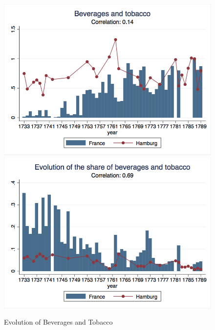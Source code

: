 \documentclass[12pt,a4paper,titlepage,english]{article}
\begin{document}
\begin{figure}
\caption{Evolution of Beverages and Tobacco}
\includegraphics[scale=.28]{bev_tobacco_long.png}
\includegraphics[scale=.28]{bev_tobacco_share.png}\\
\end{figure}
\end{document}
